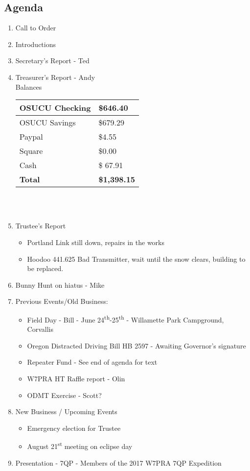 \documentclass[letter,11pt]{extarticle}
\begin{document}
	\subsection*{Agenda}
	\begin{enumerate}
		\item Call to Order
		\item Introductions
		\item Secretary's Report - Ted
		\item Treasurer's Report - Andy \\
				Balances \\
			\begin{tabular}{|l|l|} \hline
				OSUCU Checking & \$646.40 \\ \hline
				OSUCU Savings & \$679.29 \\ \hline
				Paypal & \$4.55 \\ \hline
				Square & \$0.00 \\ \hline
				Cash & \$ 67.91 \\ \hline
				\textbf{Total} & \textbf{\$1,398.15} \\ \hline
			\end{tabular} \\ \\
		\item Trustee's Report
			\begin{itemize}
				\item Portland Link still down, repairs in the works
				\item Hoodoo 441.625 Bad Transmitter, wait until the snow clears, building to be replaced.		
			\end{itemize}
		\item Bunny Hunt on hiatus - Mike
		\item Previous Events/Old Business:
			\begin{itemize}
				\item Field Day - Bill - June 24\textsuperscript{th}-25\textsuperscript{th} - Willamette Park Campground, Corvallis
				\item Oregon Distracted Driving Bill HB 2597 - Awaiting Governor's signature
				\item Repeater Fund - See end of agenda for text
				\item W7PRA HT Raffle report - Olin
				\item ODMT Exercise - Scott?
			\end{itemize}
		\item  New Business / Upcoming Events
			\begin{itemize}
				\item Emergency election for Trustee
				\item August 21\textsuperscript{st} meeting on eclipse day
			\end{itemize}
		\item  Presentation - 7QP - Members of the 2017 W7PRA 7QP Expedition
	\end{enumerate}
\end{document}
